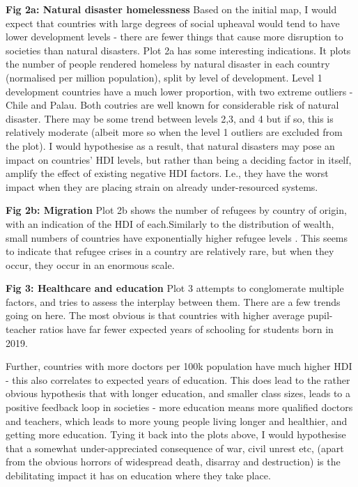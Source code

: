 \documentclass[ 10pt ]{fphw}
\begin{document}
\textbf{Fig 2a: Natural disaster homelessness} Based on the initial map, I would expect that countries with large degrees of social upheaval would tend to have lower development levels - there are fewer things that cause more disruption to societies than natural disasters. Plot 2a has some interesting indications. It plots the number of people rendered homeless by natural disaster in each country (normalised per million population), split by level of development. Level 1 development countries have a much lower proportion, with two extreme outliers - Chile and Palau. Both coutries are well known for considerable risk of natural disaster. There may be some trend between levels 2,3, and 4 but if so, this is relatively moderate (albeit more so when the level 1 outliers are excluded from the plot). I would hypothesise as a result, that natural disasters may pose an impact on countries' HDI levels, but rather than being a deciding factor in itself, amplify the effect of existing negative HDI factors. I.e., they have the worst impact when they are placing strain on already under-resourced systems.

\textbf{Fig 2b: Migration} Plot 2b shows the number of refugees by country of origin, with an indication of the HDI of each.Similarly to the distribution of wealth, small numbers of countries have exponentially higher refugee levels . This seems to indicate that refugee crises in a country are relatively rare, but when they occur, they occur in an enormous scale.

\textbf{Fig 3: Healthcare and education} Plot 3 attempts to conglomerate multiple factors, and tries to assess the interplay between them. There are a few trends going on here. The most obvious is that countries with higher average pupil-teacher ratios have far fewer expected years of schooling for students born in 2019.

Further, countries with more doctors per 100k population have much higher HDI - this also correlates to expected years of education. This does lead to the rather obvious hypothesis that with longer education, and smaller class sizes, leads to a positive feedback loop in societies - more education means more qualified doctors and teachers, which leads to more young people living longer and healthier, and getting more education. Tying it back into the plots above, I would hypothesise that a somewhat under-appreciated consequence of war, civil unrest etc, (apart from the obvious horrors of widespread death, disarray and destruction) is the debilitating impact it has on education where they take place.
\end{document}
